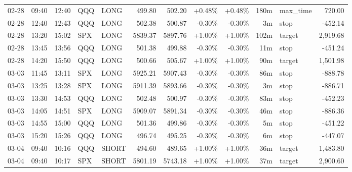 \documentclass[11pt,a4paper,twoside]{article}
\begin{document}
\begin{center}
\begin{longtable}{>{\color{txtmain}}l l l l l r r r r r >{\color{txtmain}}l r}
02-28 & 09:40 & 12:40 & QQQ & LONG & 499.80 & 502.20 & \textcolor{wingreen}{+0.48\%} & \textcolor{wingreen}{+0.48\%} & 180m & max\_time & \textcolor{wingreen}{720.00} \\
02-28 & 12:40 & 12:43 & QQQ & LONG & 502.38 & 500.87 & \textcolor{lossred}{-0.30\%} & \textcolor{lossred}{-0.30\%} & 3m & stop & \textcolor{lossred}{-452.14} \\
02-28 & 13:20 & 15:02 & SPX & LONG & 5839.37 & 5897.76 & \textcolor{wingreen}{+1.00\%} & \textcolor{wingreen}{+1.00\%} & 102m & target & \textcolor{wingreen}{2,919.68} \\
02-28 & 13:45 & 13:56 & QQQ & LONG & 501.38 & 499.88 & \textcolor{lossred}{-0.30\%} & \textcolor{lossred}{-0.30\%} & 11m & stop & \textcolor{lossred}{-451.24} \\
02-28 & 14:20 & 15:50 & QQQ & LONG & 500.66 & 505.67 & \textcolor{wingreen}{+1.00\%} & \textcolor{wingreen}{+1.00\%} & 90m & target & \textcolor{wingreen}{1,501.98} \\
03-03 & 11:45 & 13:11 & SPX & LONG & 5925.21 & 5907.43 & \textcolor{lossred}{-0.30\%} & \textcolor{lossred}{-0.30\%} & 86m & stop & \textcolor{lossred}{-888.78} \\
03-03 & 13:25 & 13:28 & SPX & LONG & 5911.39 & 5893.66 & \textcolor{lossred}{-0.30\%} & \textcolor{lossred}{-0.30\%} & 3m & stop & \textcolor{lossred}{-886.71} \\
03-03 & 13:30 & 14:53 & QQQ & LONG & 502.48 & 500.97 & \textcolor{lossred}{-0.30\%} & \textcolor{lossred}{-0.30\%} & 83m & stop & \textcolor{lossred}{-452.23} \\
03-03 & 14:05 & 14:51 & SPX & LONG & 5909.07 & 5891.34 & \textcolor{lossred}{-0.30\%} & \textcolor{lossred}{-0.30\%} & 46m & stop & \textcolor{lossred}{-886.36} \\
03-03 & 14:55 & 15:00 & QQQ & LONG & 501.36 & 499.86 & \textcolor{lossred}{-0.30\%} & \textcolor{lossred}{-0.30\%} & 5m & stop & \textcolor{lossred}{-451.22} \\
03-03 & 15:20 & 15:26 & QQQ & LONG & 496.74 & 495.25 & \textcolor{lossred}{-0.30\%} & \textcolor{lossred}{-0.30\%} & 6m & stop & \textcolor{lossred}{-447.07} \\
03-04 & 09:40 & 10:16 & QQQ & SHORT & 494.60 & 489.65 & \textcolor{wingreen}{+1.00\%} & \textcolor{wingreen}{+1.00\%} & 36m & target & \textcolor{wingreen}{1,483.80} \\
03-04 & 09:40 & 10:17 & SPX & SHORT & 5801.19 & 5743.18 & \textcolor{wingreen}{+1.00\%} & \textcolor{wingreen}{+1.00\%} & 37m & target & \textcolor{wingreen}{2,900.60} \\

\end{longtable}
\end{center}
\end{document}
